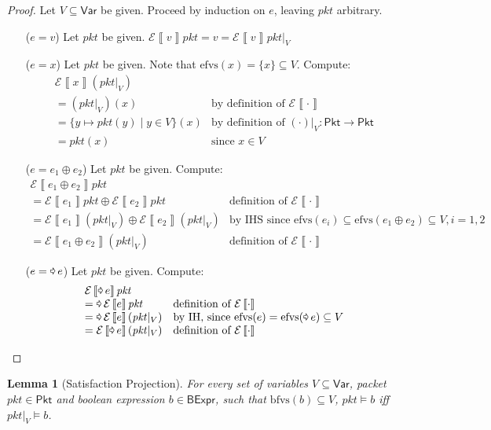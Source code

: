 \documentclass{article}
\newcommand{\pkt}{\mathit{pkt}}
\newcommand{\denote}[1]{\left\llbracket#1\right\rrbracket}
\newcommand{\edenote}[1]{\mathcal{E}\denote{#1}}
\newcommand{\binop}{\mathbin{\oplus}}
\newcommand{\unop}{\mathop{\text{\pointer}}}
\newcommand{\BExpr}{\mathsf{BExpr}}
\newcommand{\Pkt}{\mathsf{Pkt}}
\newcommand{\Var}{\mathsf{Var}}
\newcommand{\efvs}{\textrm{efvs}}
\newcommand{\bfvs}{\textrm{bfvs}}
\theoremstyle{plain}
\newtheorem{lemma}{Lemma}
\theoremstyle{definition}
\theoremstyle{remark}
\begin{document}
\begin{proof}
  Let $V \subseteq \Var$ be given.
  Proceed by induction on $e$, leaving $\pkt$ arbitrary.
  \begin{enumerate}[align=left]
  \item[($e = v$)] Let $\pkt$ be given. $\edenote{v}\pkt = v = \edenote{v}{\pkt|_V}$
  \item[($e = x$)] Let $\pkt$ be given. Note that $\efvs(x) = \{x\} \subseteq V$. Compute:
    \[\begin{array}{ll}
    \edenote{x}(\pkt|_V) \\
    = (\pkt|_V)(x)
    & \text{by definition of }\edenote\cdot\\
    = \{y \mapsto \pkt(y) \mid y \in V\}(x)
    & \text{by definition of }(\cdot)|_V : \Pkt \to \Pkt\\
    = \pkt(x) & \text{since } x \in V
    \end{array}
    \]
  \item[($e = e_1 \binop e_2$)] Let $\pkt$ be given. Compute:
    \[\begin{array}{ll}
    \edenote{e_1 \binop e_2}\pkt \\
    = \edenote{e_1}\pkt \binop \edenote{e_2}\pkt & \text{definition of }\edenote\cdot \\
    = \edenote{e_1}(\pkt|_V) \binop \edenote{e_2}(\pkt|_V) & \text{by IHS since }\efvs(e_i) \subseteq \efvs(e_1 \binop e_2) \subseteq V, i = 1,2 \\
    = \edenote{e_1 \binop e_2}(\pkt|_V) & \text{definition of }\edenote\cdot
    \end{array}\]
  \item[($e = \unop e$)] Let $\pkt$ be given. Compute:
    \[\begin{array}{ll}
    \edenote{\unop e}\pkt \\
    = \unop \edenote{e}\pkt & \text{definition of }\edenote\cdot \\
    = \unop \edenote{e}(\pkt|_V) & \text{by IH, since } \efvs(e) = \efvs(\unop e) \subseteq V \\
    = \edenote{\unop e}(\pkt|_V) & \text{definition of }\edenote\cdot
    \end{array}\]
  \end{enumerate}
\end{proof}

\begin{lemma}[Satisfaction Projection]
  \label{lem:proj-satis}
  For every set of variables $V \subseteq \Var$, packet $\pkt \in \Pkt$ and
  boolean expression $b \in \BExpr$, such that $\bfvs(b) \subseteq V$,
  $\pkt \models b$ iff $\pkt|_V \models b$.
\end{lemma}
\end{document}
